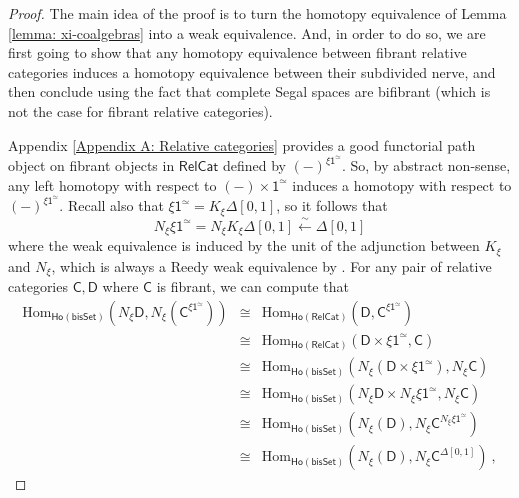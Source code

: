 \documentclass[a4paper,12pt]{amsart}
\newcommand{\ho}[1]{\mathsf{Ho}(#1)}
\theoremstyle{plain}
\theoremstyle{definition}
\theoremstyle{remark}
\begin{document}
\begin{proof}
The main idea of the proof is to turn the homotopy equivalence of Lemma \ref{lemma: xi-coalgebras} into a weak equivalence. And, in order to do so, we are first going to show that any homotopy equivalence between fibrant relative categories induces a homotopy equivalence between their subdivided nerve, and then conclude using the fact that complete Segal spaces are bifibrant (which is not the case for fibrant relative categories). 


Appendix \ref{Appendix A: Relative categories} provides a good functorial path object on fibrant objects in $\mathsf{RelCat}$ defined by $(-)^{\xi\mathsf{1}^{\simeq}}$. So, by abstract non-sense, any left homotopy with respect to $(-) \times \mathsf{1}^{\simeq}$ induces a homotopy with respect to $(-)^{\xi\mathsf{1}^{\simeq}}$. Recall also that $\xi\mathsf{1}^{\simeq}=K_{\xi}\Delta[0,1]$, so it follows that
\[
N_{\xi}\xi\mathsf{1}^{\simeq}=N_{\xi}K_{\xi}\Delta[0,1]\stackrel{\sim}{\leftarrow}\Delta[0,1]
\]
where the weak equivalence is induced by the unit of the adjunction between $K_{\xi}$ and $N_{\xi}$, which is always a Reedy weak equivalence by \cite[Proposition 10.3] {BarwickKan1}. For any pair of relative categories $\mathsf{C},\mathsf{D}$ where $\mathsf{C}$ is fibrant, we can compute that
\begin{eqnarray*}
\mathrm{Hom}_{\ho{\mathsf{bisSet}}}(N_{\xi}\mathsf{D},N_{\xi}(\mathsf{C}^{\xi\mathsf{1}^{\simeq}})) & \cong & \mathrm{Hom}_{\ho{\mathsf{RelCat}}}(\mathsf{D},\mathsf{C}^{\xi\mathsf{1}^{\simeq}})  \\
 & \cong &\mathrm{Hom}_{\ho{\mathsf{RelCat}}} (\mathsf{D}\times\xi\mathsf{1}^{\simeq},\mathsf{C}) \\
 & \cong & \mathrm{Hom}_{\ho{\mathsf{bisSet}}}(N_{\xi}(\mathsf{D}\times\xi\mathsf{1}^{\simeq}),N_{\xi}\mathsf{C}) \\
 & \cong & \mathrm{Hom}_{\ho{\mathsf{bisSet}}}(N_{\xi}\mathsf{D}\times N_{\xi}\xi\mathsf{1}^{\simeq},N_{\xi}\mathsf{C}) \\
 & \cong & \mathrm{Hom}_{\ho{\mathsf{bisSet}}}(N_{\xi}(\mathsf{D}),N_{\xi}\mathsf{C}^{N_{\xi}\xi\mathsf{1}^{\simeq}}) \\
 & \cong & \mathrm{Hom}_{\ho{\mathsf{bisSet}}}(N_{\xi}(\mathsf{D}),N_{\xi}\mathsf{C}^{\Delta[0,1]})~, 
\end{eqnarray*}


\end{proof}
\end{document}
